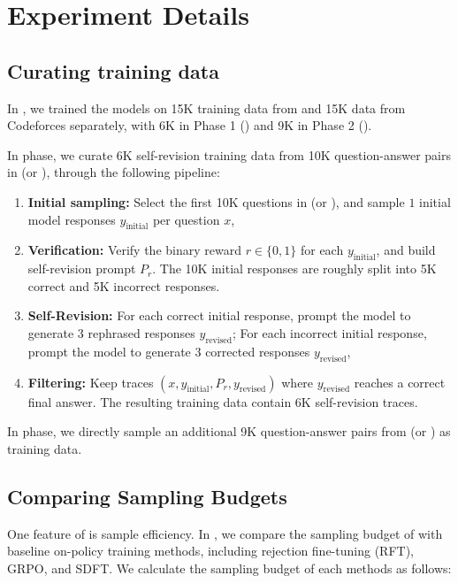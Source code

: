 \section{Experiment Details}
\subsection{Curating \ours{} training data} \label{app:training-data}
In \ours{}, we trained the models on 15K training data from \openmath{} and 15K data from Codeforces separately, with 6K in Phase 1 (\sft{}) and 9K in Phase 2 (\opsd{}).

In \sft{} phase, we curate 6K self-revision training data from 10K question-answer pairs in \openmath{} (or \cf{}), through the following pipeline:
\begin{enumerate}
    \item \textbf{Initial sampling:} Select the first 10K questions in \openmath{} (or \cf{}), and sample $1$ initial model responses $y_{\text{initial}}$ per question $x$,
    \item \textbf{Verification:} Verify the binary reward $r\in\{0,1\}$ for each $y_{\text{initial}}$, and build self-revision prompt $P_r$. The 10K initial responses are roughly split into 5K correct and 5K incorrect responses.
    \item \textbf{Self-Revision:} For each correct initial response, prompt the model to generate $3$ rephrased responses $y_\text{revised}$; For each incorrect initial response, prompt the model to generate $3$ corrected responses $y_\text{revised}$,
    \item \textbf{Filtering:} Keep traces $(x,y_{\text{initial}},P_r,y_\text{revised})$ where $y_\text{revised}$ reaches a correct final answer. The resulting training data contain 6K self-revision traces.
\end{enumerate}


In \opsd{} phase, we directly sample an additional 9K question-answer pairs from \openmath{} (or \cf{}) as training data.

\subsection{Comparing Sampling Budgets} \label{app:compare-budget}

One feature of \ours{} is sample efficiency. In , we compare the sampling budget of \ours{} with baseline on-policy training methods, including rejection fine-tuning (RFT), GRPO, and SDFT. We calculate the sampling budget of each methods as follows:\\

